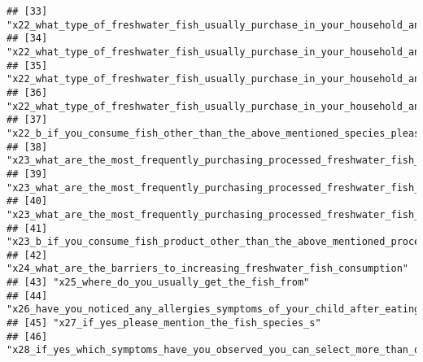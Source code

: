 \documentclass[
]{article}
\begin{document}
\begin{verbatim}
## [33] "x22_what_type_of_freshwater_fish_usually_purchase_in_your_household_and_how_much_per_month_magura"                                           
## [34] "x22_what_type_of_freshwater_fish_usually_purchase_in_your_household_and_how_much_per_month_karadu_issa"                                      
## [35] "x22_what_type_of_freshwater_fish_usually_purchase_in_your_household_and_how_much_per_month_carp_spp"                                         
## [36] "x22_what_type_of_freshwater_fish_usually_purchase_in_your_household_and_how_much_per_month_other"                                            
## [37] "x22_b_if_you_consume_fish_other_than_the_above_mentioned_species_please_mention_it_here"                                                     
## [38] "x23_what_are_the_most_frequently_purchasing_processed_freshwater_fish_products_in_your_household_per_month_dried_fish"                       
## [39] "x23_what_are_the_most_frequently_purchasing_processed_freshwater_fish_products_in_your_household_per_month_smoked_fish"                      
## [40] "x23_what_are_the_most_frequently_purchasing_processed_freshwater_fish_products_in_your_household_per_month_other"                            
## [41] "x23_b_if_you_consume_fish_product_other_than_the_above_mentioned_processed_product_please_mention_it_here"                                   
## [42] "x24_what_are_the_barriers_to_increasing_freshwater_fish_consumption"                                                                         
## [43] "x25_where_do_you_usually_get_the_fish_from"                                                                                                  
## [44] "x26_have_you_noticed_any_allergies_symptoms_of_your_child_after_eating_freshwater_fish"                                                      
## [45] "x27_if_yes_please_mention_the_fish_species_s"                                                                                                
## [46] "x28_if_yes_which_symptoms_have_you_observed_you_can_select_more_than_one_option"
\end{verbatim}
\end{document}
